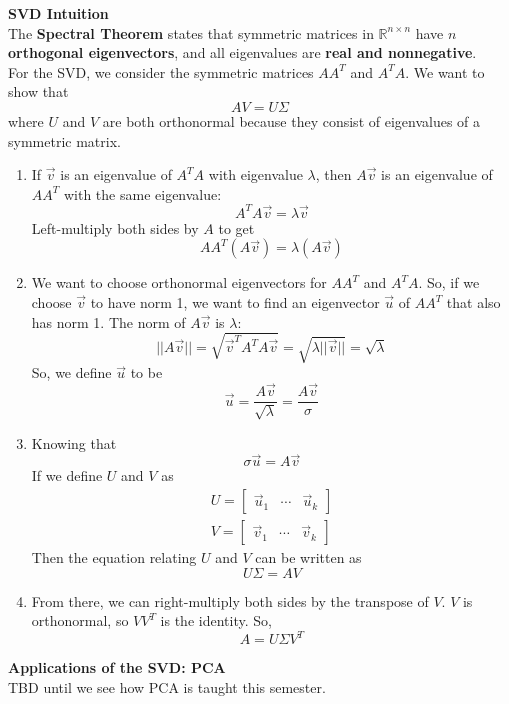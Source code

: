 \textbf{SVD Intuition} \\
\newline
The \textbf{Spectral Theorem} states that symmetric matrices in $\mathbb{R}^{n\times n}$ have $n$ \textbf{orthogonal eigenvectors}, and all eigenvalues are \textbf{real and nonnegative}. \\
\newline
For the SVD, we consider the symmetric matrices $AA^T$ and $A^T A$. We want to show that
$$AV = U\Sigma$$
where $U$ and $V$ are both orthonormal because they consist of eigenvalues of a symmetric matrix.
\begin{enumerate}
    \item If $\vec{v}$ is an eigenvalue of $A^T A$ with eigenvalue $\lambda$, then $A\vec{v}$ is an eigenvalue of $AA^T$ with the same eigenvalue:
    $$A^T A \vec{v} = \lambda \vec{v}$$
    Left-multiply both sides by $A$ to get
    $$A A^T (A \vec{v}) = \lambda (A \vec{v})$$
    \item We want to choose orthonormal eigenvectors for $AA^T$ and $A^T A$. 
    So, if we choose $\vec{v}$ to have norm 1, we want to find an eigenvector $\vec{u}$ of $AA^T$ that also has norm 1. 
    The norm of $A \vec{v}$ is $\lambda$:
    $$||A\vec{v}|| = \sqrt{\vec{v}^T A^T A \vec{v}} = \sqrt{\lambda ||\vec{v}||} = \sqrt{\lambda}$$
    So, we define $\vec{u}$ to be
    $$\vec{u} = \frac{A \vec{v}}{\sqrt{\lambda}} = \frac{A \vec{v}}{\sigma}$$
    \item Knowing that 
    $$\sigma \vec{u} = A \vec{v}$$
    If we define $U$ and $V$ as
    \begin{align*}
        U = \begin{bmatrix} \vec{u}_1 & \cdots & \vec{u}_k \end{bmatrix} \\
        V = \begin{bmatrix} \vec{v}_1 & \cdots & \vec{v}_k \end{bmatrix}
    \end{align*}
    Then the equation relating $U$ and $V$ can be written as
    $$U\Sigma = AV$$
    \item From there, we can right-multiply both sides by the transpose of $V$. $V$ is orthonormal, so $V V^T$ is the identity. So,
    $$A = U \Sigma V^T$$
\end{enumerate}

\textbf{Applications of the SVD: PCA} \\
\newline
TBD until we see how PCA is taught this semester.